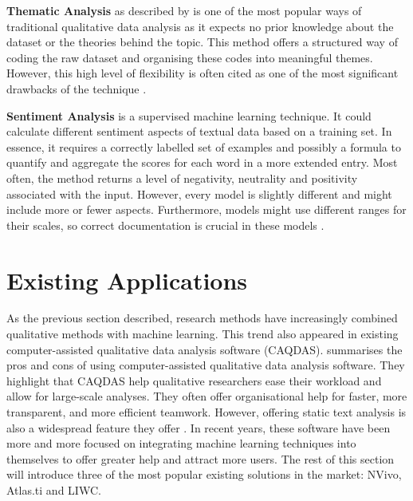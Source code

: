 \documentclass{l4proj}
\begin{document}
\textbf{Thematic Analysis} as described by \cite{braun2006using} is one of the most popular ways of traditional qualitative data analysis as it expects no prior knowledge about the dataset or the theories behind the topic. This method offers a structured way of coding the raw dataset and organising these codes into meaningful themes. However, this high level of flexibility is often cited as one of the most significant drawbacks of the technique \citep{braun2006using, braun2019reflecting}.

\textbf{Sentiment Analysis} is a supervised machine learning technique. It could calculate different sentiment aspects of textual data based on a training set. In essence, it requires a correctly labelled set of examples and possibly a formula to quantify and aggregate the scores for each word in a more extended entry. Most often, the method returns a level of negativity, neutrality and positivity associated with the input. However, every model is slightly different and might include more or fewer aspects. Furthermore, models might use different ranges for their scales, so correct documentation is crucial in these models \citep{medhat2014sentiment}.

\section{Existing Applications}
As the previous section described, research methods have increasingly combined qualitative methods with machine learning. This trend also appeared in existing computer-assisted qualitative data analysis software (CAQDAS). \cite{chandra2019computer} summarises the pros and cons of using computer-assisted qualitative data analysis software. They highlight that CAQDAS help qualitative researchers ease their workload and allow for large-scale analyses. They often offer organisational help for faster, more transparent, and more efficient teamwork. However, offering static text analysis is also a widespread feature they offer \citep{chandra2019computer}. In recent years, these software have been more and more focused on integrating machine learning techniques into themselves to offer greater help and attract more users. The rest of this section will introduce three of the most popular existing solutions in the market: NVivo, Atlas.ti and LIWC.
\end{document}
